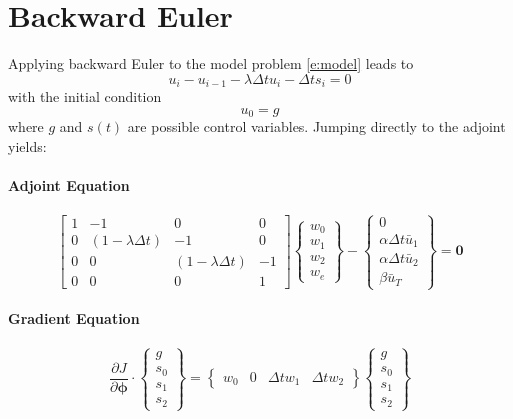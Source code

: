 \documentclass[10pt, oneside]{article}
\newcommand{\vect}[1]{\mathbf{#1}}
\newcommand{\bphi}{\boldsymbol{\phi}}
\begin{document}
\section{Backward Euler}
Applying backward Euler to the model problem \eqref{e:model} leads to
%
\[ u_i - u_{i-1} - \lambda \Delta t u_i - \Delta t s_i = 0 \]
%
with the initial condition
%
\[ u_0 = g \]
%
where $g$ and $s(t)$ are possible control variables.  Jumping directly to the adjoint yields:
%
\paragraph{Adjoint Equation}
\begin{equation} \label{e:be-adjoint}
\begin{bmatrix}
1 & -1  & 0 & 0 \\
0 & (1-\lambda\Delta t) & -1 & 0 \\[0.5ex]
0 & 0  & (1-\lambda\Delta t) & -1 \\
0 & 0 & 0 & 1
\end{bmatrix}
\begin{Bmatrix}
w_0 \\ w_1 \\ w_2 \\ w_e
\end{Bmatrix} -
\begin{Bmatrix}
0 \\
\alpha \Delta t \bar u_1 \\
\alpha \Delta t \bar u_2 \\
\beta \bar u_T
\end{Bmatrix} = \vect{0}
\end{equation}
%
\paragraph{Gradient Equation}
\begin{equation} \label{e:be-gradient}
\frac{\partial J}{\partial\bphi} \cdot \begin{Bmatrix}
g \\ s_0 \\ s_1 \\ s_2 
\end{Bmatrix} =  
\begin{Bmatrix}
w_0 & 0 & \Delta t w_1 & \Delta t w_2
\end{Bmatrix}
\begin{Bmatrix}
g \\ s_0 \\ s_1 \\ s_2 
\end{Bmatrix}
\end{equation}
\end{document}
